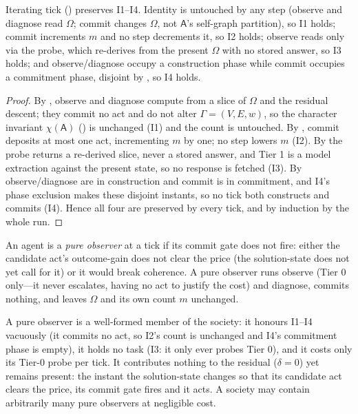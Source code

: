 \documentclass[11pt,twocolumn,a4paper]{article}
\newcommand{\Agent}{\mathsf{A}}
\newcommand{\Self}{\Gamma}
\newcommand{\V}{V}
\newcommand{\E}{E}
\newcommand{\wt}{w}
\newcommand{\Char}{\chi}
\begin{document}
\begin{theorem}
\label{thm:tick-invariants}
Iterating $\mathrm{tick}$ () preserves I1--I4. Identity is
untouched by any step (observe and diagnose read $\Omega$; commit changes
$\Omega$, not $\Agent$'s self-graph partition), so I1 holds; commit increments
$m$ and no step decrements it, so I2 holds; observe reads only via the probe,
which re-derives from the present $\Omega$ with no stored answer, so I3 holds;
and observe/diagnose occupy a construction phase while commit occupies a
commitment phase, disjoint by , so I4 holds.
\end{theorem}

\begin{proof}
By , observe and diagnose compute
from a slice of $\Omega$ and the residual descent; they commit no act and do
not alter $\Self=(\V,\E,\wt)$, so the character invariant $\Char(\Agent)$
() is unchanged (I1) and the count is untouched. By
, commit deposits at most one act, incrementing $m$ by
one; no step lowers $m$ (I2). By  the probe returns a
re-derived slice, never a stored answer, and Tier 1 is a model extraction
against the present state, so no response is fetched (I3). By 
observe/diagnose are in construction and commit is in commitment, and I4's
phase exclusion makes these disjoint instants, so no tick both constructs and
commits (I4). Hence all four are preserved by every tick, and by induction by
the whole run.
\end{proof}

\begin{definition}
\label{def:observer}
An agent is a \emph{pure observer} at a tick if its commit gate does not fire:
either the candidate act's outcome-gain does not clear the price (the
solution-state does not yet call for it) or it would break coherence. A pure
observer runs observe (Tier 0 only---it never escalates, having no act to
justify the cost) and diagnose, commits nothing, and leaves $\Omega$ and its
own count $m$ unchanged.
\end{definition}

\begin{theorem}
\label{thm:observer}
A pure observer is a well-formed member of the society: it honours I1--I4
vacuously (it commits no act, so I2's count is unchanged and I4's commitment
phase is empty), it holds no task (I3: it only ever probes Tier 0), and it
costs only its Tier-0 probe per tick. It contributes nothing to the residual
($\delta=0$) yet remains present: the instant the solution-state changes so
that its candidate act clears the price, its commit gate fires and it acts. A
society may contain arbitrarily many pure observers at negligible cost.
\end{theorem}
\end{document}
